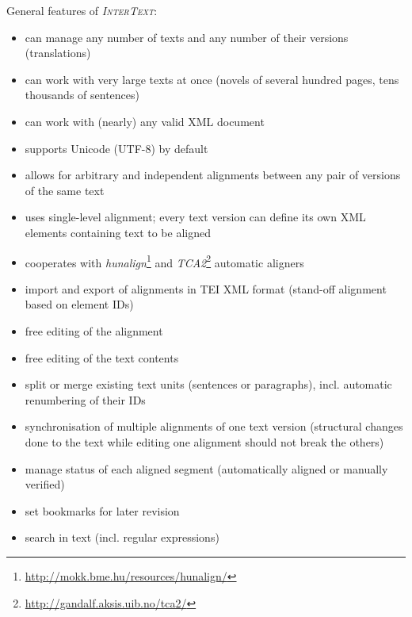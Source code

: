 \documentclass[a4paper,10pt,oneside]{book}
\newcommand{\IT}{\textit{\textsc{InterText}}\xspace}
\begin{document}
General features of \IT:
\begin{itemize}
	\item can manage any number of texts and any number of their versions (translations)
	\item can work with very large texts at once (novels of several hundred pages, tens thousands of sentences)
	\item can work with (nearly) any valid XML document
	\item supports Unicode (UTF-8) by default
	\item allows for arbitrary and independent alignments between any pair of versions of the same text
	\item uses single-level alignment; every text version can define its own XML elements containing text to be aligned
	\item cooperates with \emph{hunalign}\footnote{\url{http://mokk.bme.hu/resources/hunalign/}} and \emph{TCA2}\footnote{\url{http://gandalf.aksis.uib.no/tca2/}} automatic aligners
	\item import and export of alignments in TEI XML format (stand-off alignment based on element IDs)
	\item free editing of the alignment
	\item free editing of the text contents
	\item split or merge existing text units (sentences or paragraphs), incl. automatic renumbering of their IDs
	\item synchronisation of multiple alignments of one text version (structural changes done to the text while editing one alignment should not break the others)
	\item manage status of each aligned segment (automatically aligned or manually verified)
	\item set bookmarks for later revision
	\item search in text (incl. regular expressions)
\end{itemize}
\end{document}

